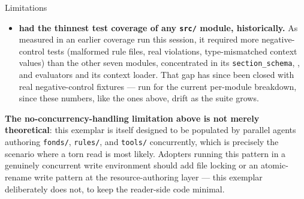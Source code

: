 \documentclass[
  ignorenonframetext,
]{beamer}
\begin{document}
\begin{frame}{Limitations}
\begin{itemize}
  rule with a corresponding evaluator function.
\item
  \textbf{ had the thinnest test
  coverage of any \texttt{src/} module, historically.} As measured in an
  earlier coverage run this session, it required more negative-control
  tests (malformed rule files, real violations, type-mismatched context
  values) than the other seven modules, concentrated in its
  \texttt{section\_schema}, , and
   evaluators and its context loader. That gap
  has since been closed with real negative-control fixtures --- run
   for the
  current per-module breakdown, since these numbers, like the ones
  above, drift as the suite grows.
\end{itemize}

\textbf{The no-concurrency-handling limitation above is not merely
theoretical}: this exemplar is itself designed to be populated by
parallel agents authoring \texttt{fonds/}, \texttt{rules/}, and
\texttt{tools/} concurrently, which is precisely the scenario where a
torn read is most likely. Adopters running this pattern in a genuinely
concurrent write environment should add file locking or an atomic-rename
write pattern at the resource-authoring layer --- this exemplar
deliberately does not, to keep the reader-side code minimal.
\end{frame}
\end{document}
